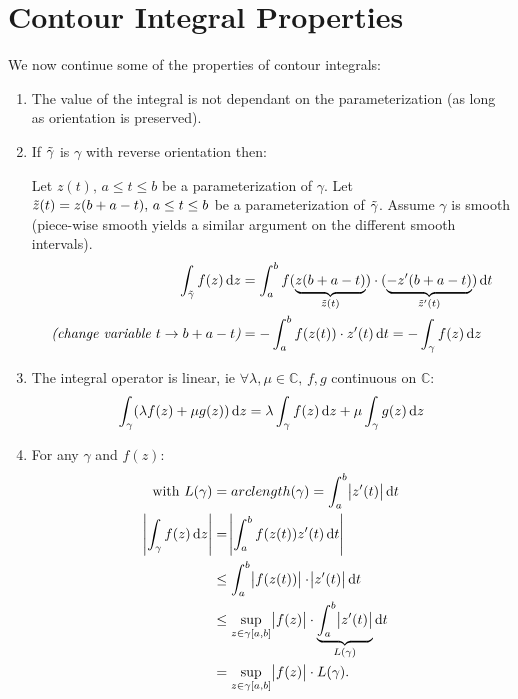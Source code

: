 \section{Contour Integral Properties}

We now continue some of the properties of contour integrals:

\begin{enumerate}
    \item The value of the integral is not dependant on the parameterization (as long as orientation is preserved).
    \item If $\Tilde{\gamma}$ is $\gamma$ with reverse orientation then:
    
    Let $z(t), \, a\leq t \leq b$ be a parameterization of $\gamma$. Let $\Tilde{z}(t) = z(b+a-t), \, a\leq t \leq b$ be a parameterization of $\Tilde{\gamma}$. Assume $\gamma$ is smooth (piece-wise smooth yields a similar argument on the different smooth intervals).
    \begin{align*}
         \int_{\Tilde{\gamma}} f(z)  \dif z &= \int_{a}^b f( \underbrace{z(b+a-t)}_{\Tilde{z}(t)}) \cdot (\underbrace{-z'(b+a-t)}_{\Tilde{z}'(t)})  \dif t\\
        \textit{(change variable $t \to b+a -t$)}  &= - \int_a^b f(z(t))\cdot z'(t) \dif t = - \int_{\gamma} f(z)  \dif z
    \end{align*}
    
    \item The integral operator is linear, ie $\forall \lambda, \mu \in \mathbb{C}, \, f,g$ continuous on $\mathbb{C}$:
    \begin{align*}
        \int_{\gamma} (\lambda f(z) + \mu g(z))  \dif z = \lambda \int_{\gamma} f(z)  \dif z + \mu \int_{\gamma} g(z)  \dif z
    \end{align*}
    
    \item For any $\gamma$ and $f(z)$:
    \begin{align} \label{eq:integral-bound}
    \text{with } L(\gamma) &= arclength(\gamma) = \int_a^b \abs{z'(t)}  \dif t \nonumber \\
    \abs{\int_{\gamma} f(z)  \dif z} &= \abs{\int_a^b f(z(t)) z'(t)  \dif t} \nonumber \\
    &\leq \int_a^b \abs{f(z(t))} \cdot \abs{z'(t)}  \dif t\nonumber \\
    &\leq \sup_{z \in \gamma[a,b]} \abs{f(z)} \cdot \underbrace{\int_a^b \abs{z'(t)}}_{L(\gamma)}  \dif t \nonumber \\
    &= \sup\limits_{z \in \gamma[a,b]} \abs{f(z)} \cdot L(\gamma).
    \end{align}
   
   
\end{enumerate}


